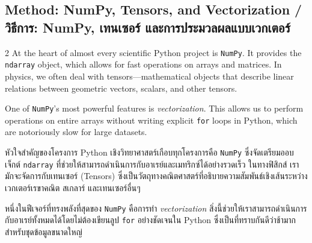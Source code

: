 \subsection{Method: NumPy, Tensors, and Vectorization \quad / \quad \textthai{วิธีการ: NumPy, เทนเซอร์ และการประมวลผลแบบเวกเตอร์}}
\begin{paracol}{2}
At the heart of almost every scientific Python project is \texttt{NumPy}. It provides the \texttt{ndarray} object, which allows for fast operations on arrays and matrices. In physics, we often deal with tensors—mathematical objects that describe linear relations between geometric vectors, scalars, and other tensors.

One of \texttt{NumPy}'s most powerful features is \textit{vectorization}. This allows us to perform operations on entire arrays without writing explicit \texttt{for} loops in Python, which are notoriously slow for large datasets.

\switchcolumn

\begin{thai}
หัวใจสำคัญของโครงการ Python เชิงวิทยาศาสตร์เกือบทุกโครงการคือ \texttt{NumPy} ซึ่งจัดเตรียมออบเจ็กต์ \texttt{ndarray} ที่ช่วยให้สามารถดำเนินการกับอาเรย์และเมทริกซ์ได้อย่างรวดเร็ว ในทางฟิสิกส์ เรามักจะจัดการกับเทนเซอร์ (Tensors) ซึ่งเป็นวัตถุทางคณิตศาสตร์ที่อธิบายความสัมพันธ์เชิงเส้นระหว่างเวกเตอร์เรขาคณิต สเกลาร์ และเทนเซอร์อื่นๆ

หนึ่งในฟีเจอร์ที่ทรงพลังที่สุดของ \texttt{NumPy} คือการทำ \textit{vectorization} สิ่งนี้ช่วยให้เราสามารถดำเนินการกับอาเรย์ทั้งหมดได้โดยไม่ต้องเขียนลูป \texttt{for} อย่างชัดเจนใน Python ซึ่งเป็นที่ทราบกันดีว่าช้ามากสำหรับชุดข้อมูลขนาดใหญ่
\end{thai}
\end{paracol}
